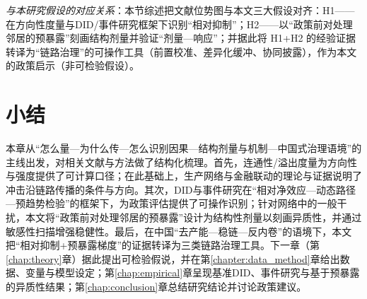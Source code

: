 \noindent\textit{与本研究假设的对应关系}：本节综述把文献位势图与本文三大假设对齐：H1——在方向性度量与DID/事件研究框架下识别“相对抑制”；H2——以“政策前对处理邻居的预暴露”刻画结构剂量并验证“剂量—响应”；并据此将 H1+H2 的经验证据转译为“链路治理”的可操作工具（前置校准、差异化缓冲、协同披露），作为本文的政策启示（非可检验假设）。
\section{小结}
本章从“怎么量—为什么传—怎么识别因果—结构剂量与机制—中国式治理语境”的主线出发，对相关文献与方法做了结构化梳理。首先，连通性/溢出度量为方向性与强度提供了可计算口径；在此基础上，生产网络与金融联动的理论与证据说明了冲击沿链路传播的条件与方向。其次，DID与事件研究在“相对净效应—动态路径—预趋势检验”的框架下，为政策评估提供了可操作识别；针对网络中的一般干扰，本文将“政策前对处理邻居的预暴露”设计为结构性剂量以刻画异质性，并通过敏感性扫描增强稳健性。最后，在中国“去产能—稳链—反内卷”的语境下，本文把“相对抑制+预暴露梯度”的证据转译为三类链路治理工具。下一章（第\ref{chap:theory}章）据此提出可检验假说，并在第\ref{chapter:data_method}章给出数据、变量与模型设定；第\ref{chap:empirical}章呈现基准DID、事件研究与基于预暴露的异质性结果；第\ref{chap:conclusion}章总结研究结论并讨论政策建议。